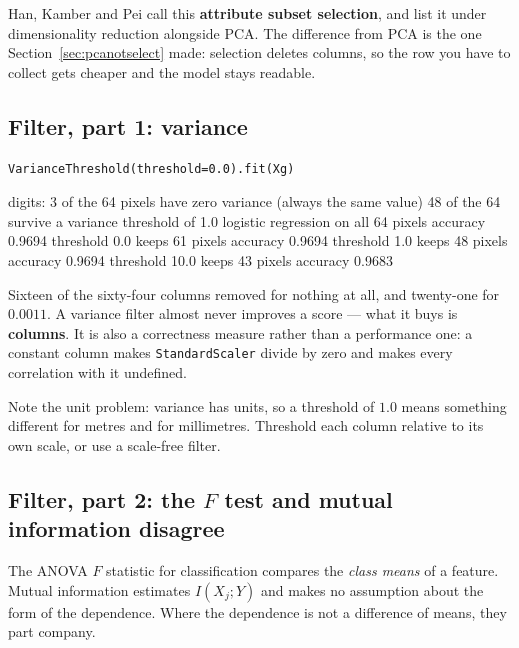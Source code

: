 \documentclass[11pt]{article}
\begin{document}
Han, Kamber and Pei call this \textbf{attribute subset selection}, and list it
under dimensionality reduction alongside PCA. The difference from PCA is the
one Section~\ref{sec:pcanotselect} made: selection deletes columns, so the row
you have to collect gets cheaper and the model stays readable.

\subsection{Filter, part 1: variance}
\label{sec:variance}

\begin{lstlisting}
VarianceThreshold(threshold=0.0).fit(Xg)
\end{lstlisting}
\begin{codeout}
digits: 3 of the 64 pixels have zero variance (always the same value)
        48 of the 64 survive a variance threshold of 1.0
logistic regression on all 64 pixels          accuracy 0.9694
      threshold   0.0 keeps 61 pixels            accuracy 0.9694
      threshold   1.0 keeps 48 pixels            accuracy 0.9694
      threshold  10.0 keeps 43 pixels            accuracy 0.9683
\end{codeout}

Sixteen of the sixty-four columns removed for nothing at all, and twenty-one
for $0.0011$. A variance filter almost never improves a score --- what it buys
is \textbf{columns}. It
is also a correctness measure rather than a performance one: a constant column
makes \texttt{StandardScaler} divide by zero and makes every correlation with
it undefined.

Note the unit problem: variance has units, so a threshold of $1.0$ means
something different for metres and for millimetres. Threshold each column
relative to its own scale, or use a scale-free filter.

\subsection{Filter, part 2: the $F$ test and mutual information disagree}
\label{sec:filters}

The ANOVA $F$ statistic for classification compares the \emph{class means} of
a feature. Mutual information estimates $I(X_j; Y)$ and makes no assumption
about the form of the dependence. Where the dependence is not a difference of
means, they part company.
\end{document}

